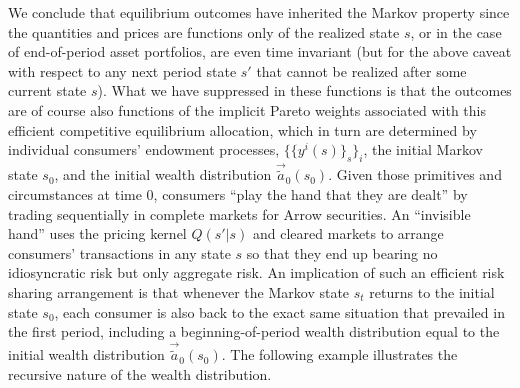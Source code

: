  
We conclude that equilibrium outcomes have
inherited the Markov property since the 
quantities and prices are functions only of 
the realized state $s$, or in the case of 
end-of-period asset portfolios, are even 
time invariant (but for the above caveat with 
respect to any next period state $s'$ that 
cannot be realized after some current 
state $s$).
What we have suppressed in these functions is 
that the outcomes are of course also functions 
of the implicit Pareto weights associated
with this efficient competitive equilibrium 
allocation, which in turn are determined by 
individual consumers' endowment processes, 
$\{\{y^i(s)\}_s\}_i$, the initial Markov 
state $s_0$, and the initial wealth distribution
$\vec {\tilde a}_0(s_0)$. Given those primitives 
and circumstances at time 0, 
consumers ``play the hand that they are dealt'' 
by trading sequentially in complete markets for 
Arrow securities. An ``invisible hand''
uses the pricing kernel $Q(s'|s)$ and cleared 
markets to arrange consumers' transactions 
in any state $s$ so that they end up bearing
no idiosyncratic risk but only aggregate risk.
An implication of such an efficient risk sharing
arrangement is that whenever the Markov state $s_t$ 
returns to the initial state $s_0$, each consumer 
is also back to the exact same situation that 
prevailed in the first period, including a
beginning-of-period wealth distribution equal to
the initial wealth distribution
$\vec {\tilde a}_0(s_0)$. The following example
illustrates the recursive nature of the wealth
distribution.




